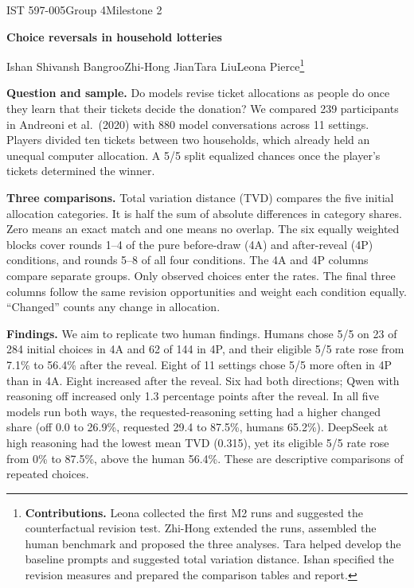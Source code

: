 \documentclass[11pt,letterpaper]{article}
\newcommand{\head}[1]{\par\vspace{1pt}\noindent\textbf{#1}\hspace{.3em}}
\newcommand{\titleline}[1]{{\LARGE\bfseries #1\par}\vspace{3pt}}
\newcommand{\analysispath}{output/analysis/milestone_2}
\begin{document}
{\small IST 597-005\quad Group 4\quad Milestone 2}\par
\titleline{Choice reversals in household lotteries}
Ishan Shivansh Bangroo\quad Zhi-Hong Jian\quad Tara Liu\quad Leona Pierce\footnote{\scriptsize\textbf{Contributions.} Leona collected the first M2 runs and suggested the counterfactual revision test. Zhi-Hong extended the runs, assembled the human benchmark and proposed the three analyses. Tara helped develop the baseline prompts and suggested total variation distance. Ishan specified the revision measures and prepared the comparison tables and report.}

\head{Question and sample.} Do models revise ticket allocations as people do once they learn that their tickets decide the donation? We compared 239 participants in Andreoni et al.\ (2020) with 880 model conversations across 11 settings. Players divided ten tickets between two households, which already held an unequal computer allocation. A 5/5 split equalized chances once the player's tickets determined the winner.

\head{Three comparisons.} Total variation distance (TVD) compares the five initial allocation categories. It is half the sum of absolute differences in category shares. Zero means an exact match and one means no overlap. The six equally weighted blocks cover rounds 1--4 of the pure before-draw (4A) and after-reveal (4P) conditions, and rounds 5--8 of all four conditions. The 4A and 4P columns compare separate groups. Only observed choices enter the rates. The final three columns follow the same revision opportunities and weight each condition equally. ``Changed'' counts any change in allocation.

{\centering\small\setlength{\tabcolsep}{5.25pt}\renewcommand{\arraystretch}{1.03}
\def\plannedonly{}\par}

\head{Findings.} We aim to replicate two human findings. Humans chose 5/5 on 23 of 284 initial choices in 4A and 62 of 144 in 4P, and their eligible 5/5 rate rose from 7.1\% to 56.4\% after the reveal. Eight of 11 settings chose 5/5 more often in 4P than in 4A. Eight increased after the reveal. Six had both directions; Qwen with reasoning off increased only 1.3 percentage points after the reveal. In all five models run both ways, the requested-reasoning setting had a higher changed share (off 0.0 to 26.9\%, requested 29.4 to 87.5\%, humans 65.2\%). DeepSeek at high reasoning had the lowest mean TVD (0.315), yet its eligible 5/5 rate rose from 0\% to 87.5\%, above the human 56.4\%. These are descriptive comparisons of repeated choices.
\end{document}
